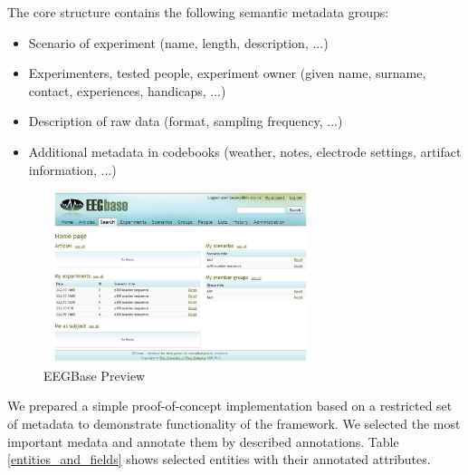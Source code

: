 \documentclass[conference]{IEEEtran}
\begin{document}
The core structure contains the following semantic metadata groups:

\begin{itemize}
\item Scenario of experiment (name, length, description, ...)
\item Experimenters, tested people, experiment owner (given name, surname, contact, experiences, handicaps, ...)
\item Description of raw data (format, sampling frequency, ...)
\item Additional metadata in codebooks (weather, notes, electrode settings, artifact information, ...)
\end{itemize}


\begin{figure}
\centering\includegraphics[width=8cm, height=5cm]{portal_preview}
\caption{\label{portal}EEGBase Preview}

\end{figure}

We prepared a simple proof-of-concept implementation based on a restricted set of metadata to demonstrate functionality of the framework. We selected the most important medata and annotate them by described annotations. Table \ref{entities_and_fields} shows selected entities with their annotated attributes.
\end{document}
